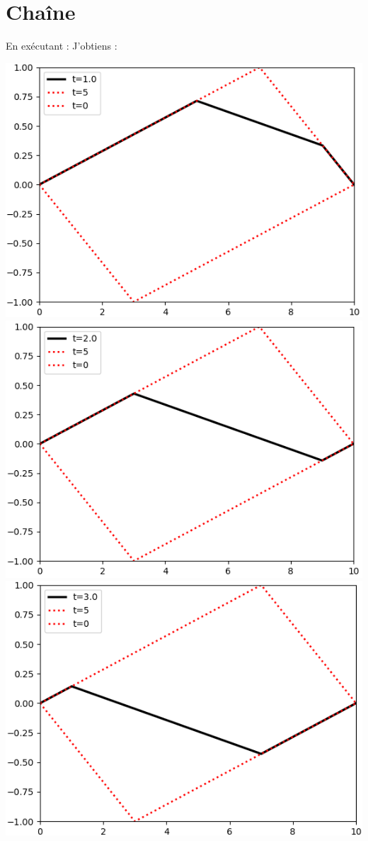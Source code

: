 \section{Chaîne}


En exécutant :
J'obtiens :
\begin{center}
  \includegraphics[scale=0.5]{section-03/qc-1.png}
  \includegraphics[scale=0.5]{section-03/qc-2.png}
  \includegraphics[scale=0.5]{section-03/qc-3.png}

\end{center}
